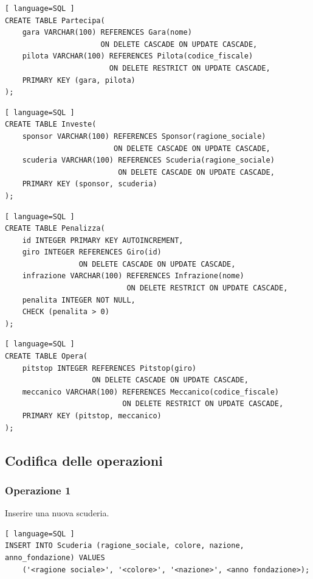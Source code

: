 \documentclass[11pt]{article}
\begin{document}
\begin{lstlisting}[ language=SQL ]
CREATE TABLE Partecipa(
    gara VARCHAR(100) REFERENCES Gara(nome) 
                      ON DELETE CASCADE ON UPDATE CASCADE,
    pilota VARCHAR(100) REFERENCES Pilota(codice_fiscale) 
                        ON DELETE RESTRICT ON UPDATE CASCADE,
    PRIMARY KEY (gara, pilota)
);
\end{lstlisting}

\begin{lstlisting}[ language=SQL ]
CREATE TABLE Investe(
    sponsor VARCHAR(100) REFERENCES Sponsor(ragione_sociale) 
                         ON DELETE CASCADE ON UPDATE CASCADE,
    scuderia VARCHAR(100) REFERENCES Scuderia(ragione_sociale) 
                          ON DELETE CASCADE ON UPDATE CASCADE,
    PRIMARY KEY (sponsor, scuderia)
);
\end{lstlisting}

\newpage
\begin{lstlisting}[ language=SQL ]
CREATE TABLE Penalizza(
    id INTEGER PRIMARY KEY AUTOINCREMENT,
    giro INTEGER REFERENCES Giro(id) 
                 ON DELETE CASCADE ON UPDATE CASCADE,
    infrazione VARCHAR(100) REFERENCES Infrazione(nome) 
                            ON DELETE RESTRICT ON UPDATE CASCADE,
    penalita INTEGER NOT NULL,
    CHECK (penalita > 0)
);
\end{lstlisting}

\begin{lstlisting}[ language=SQL ]
CREATE TABLE Opera(
    pitstop INTEGER REFERENCES Pitstop(giro) 
                    ON DELETE CASCADE ON UPDATE CASCADE,
    meccanico VARCHAR(100) REFERENCES Meccanico(codice_fiscale) 
                           ON DELETE RESTRICT ON UPDATE CASCADE,
    PRIMARY KEY (pitstop, meccanico)
);
\end{lstlisting}



\subsection{Codifica delle operazioni}

\subsubsection{Operazione 1}
Inserire una nuova scuderia.
\begin{lstlisting}[ language=SQL ]
INSERT INTO Scuderia (ragione_sociale, colore, nazione, anno_fondazione) VALUES
    ('<ragione sociale>', '<colore>', '<nazione>', <anno fondazione>);
\end{lstlisting}
\end{document}
